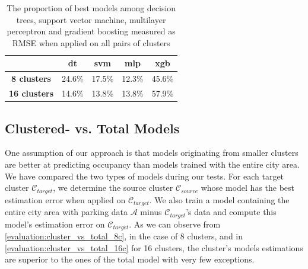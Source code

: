 \begin{table}[!ht]
	\centering
	\small
	\setlength\extrarowheight{5pt}
	\begin{tabular}{ | c | c | c | c | c |}
		\hline
		& \textbf{dt} & \textbf{svm} & \textbf{mlp} & \textbf{xgb} \\ \hline
		\textbf{8 clusters} & 24.6\% & 17.5\% & 12.3\% & 45.6\% \\ \hline
		\textbf{16 clusters} & 14.6\% & 13.8\% & 13.8\% & 57.9\% \\ \hline
	\end{tabular}
	\caption{The proportion of best models among decision trees, support vector machine, multilayer perceptron and gradient boosting  measured as RMSE when applied on all pairs of clusters}
	\label{evaluation:best_model_method}
\end{table}

\subsection{Clustered- vs. Total Models}
\label{small_vs_large}
One assumption of our approach is that models originating from smaller clusters are better at predicting occupancy than models trained with the entire city area.
We have compared the two types of models during our tests.
For each target cluster $\mathcal{C}_{target}$, we determine the source cluster $\mathcal{C}_{source}$ whose model has the best estimation error when applied on $\mathcal{C}_{target}$.
We also train a model containing the entire city area with parking data $\mathcal{A}$ minus $\mathcal{C}_{target}$'s data and compute this model's estimation error on $\mathcal{C}_{target}$.
As we can observe from \autoref{evaluation:cluster_vs_total_8c}, in the case of 8 clusters, and in \autoref{evaluation:cluster_vs_total_16c} for 16 clusters, the cluster's models estimations are superior to the ones of the total model with very few exceptions.

